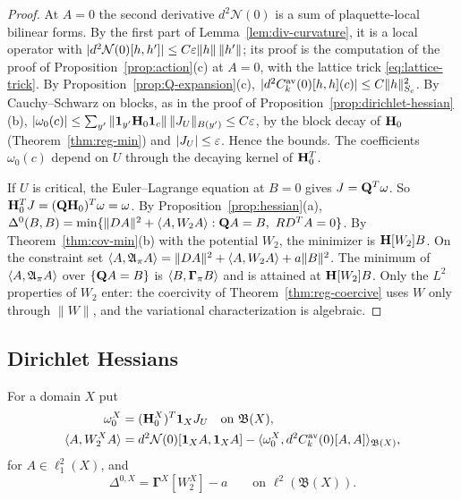 \begin{proof}
At $A=0$ the second derivative $d^2\mathcal N(0)$ is a sum of plaquette-local bilinear forms. By the first part of Lemma~\ref{lem:div-curvature}, it is a local operator with $|d^2\mathcal N(0)[h,h']|\le C\varepsilon\|h\|\,\|h'\|$; its proof is the computation of the proof of Proposition~\ref{prop:action}(c) at $A=0$, with the lattice trick \eqref{eq:lattice-trick}. By Proposition~\ref{prop:Q-expansion}(c), $|d^2C^{\rm av}_k(0)[h,h](c)|\le C\|h\|^2_{S_c}$. By Cauchy--Schwarz on blocks, as in the proof of Proposition~\ref{prop:dirichlet-hessian}(b), $|\omega_0(c)|\le\sum_{y'}\|\mathbf 1_{y'}\mathbf H_0\mathbf 1_c\|\,\|J_U\|_{B(y')}\le C\varepsilon$, by the block decay of $\mathbf H_0$ (Theorem~\ref{thm:reg-min}) and $|J_U|\le\varepsilon$. Hence the bounds. The coefficients $\omega_0(c)$ depend on $U$ through the decaying kernel of $\mathbf H_0^T$.

If $U$ is critical, the Euler--Lagrange equation at $B=0$ gives $J=\mathbf Q^T\omega$. So $\mathbf H_0^TJ=(\mathbf Q\mathbf H_0)^T\omega=\omega$. By Proposition~\ref{prop:hessian}(a), $\Delta^0(B,B)=\min\{\|DA\|^2+\ip A{W_2A}:\bQ A=B,\ RD^TA=0\}$. By Theorem~\ref{thm:cov-min}(b) with the potential $W_2$, the minimizer is $\mathbf H[W_2]B$. On the constraint set $\langle A,\mathfrak A_\pi A\rangle=\|DA\|^2+\langle A,W_2A\rangle+a\|B\|^2$. The minimum of $\langle A,\mathfrak A_\pi A\rangle$ over $\{\mathbf Q A=B\}$ is $\langle B,\boldsymbol\Gamma_\pi B\rangle$ and is attained at $\mathbf H[W_2]B$. Only the $L^2$ properties of $W_2$ enter: the coercivity of Theorem~\ref{thm:reg-coercive} uses $W$ only through $\|W\|$, and the variational characterization is algebraic.
\end{proof}

\subsection{Dirichlet Hessians}\label{ss:37.3}

\begin{definition}\label{def:dirichlet-hessian}
For a domain $X$ put
\[
\begin{aligned}
\omega_0^X&=(\mathbf H_0^X)^T\mathbf 1_XJ_U\quad\text{on }\mathfrak B(X),\\
\langle A,W_2^XA\rangle&=d^2\mathcal N(0)[\mathbf 1_XA,\mathbf 1_XA]-\langle \omega_0^X,d^2C^{\rm av}_k(0)[A,A]\rangle_{\mathfrak B(X)},
\end{aligned}
\]
for $A\in\ell^2_1(X)$, and
\[
\Delta^{0,X}=\boldsymbol\Gamma^X[W_2^X]-a\qquad\text{on }\ell^2(\mathfrak B(X)).
\]
\end{definition}

